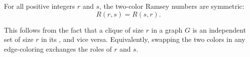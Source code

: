 \begin{proposition} \label{proposition:symmetry_of_two_color_ramsey_numbers_R_r_s_equals_R_s_r}
For all positive integers $r$ and $s$, the two-color Ramsey numbers are symmetric:
$$R(r,s) = R(s,r).$$

This follows from the fact that a clique of size $r$ in a graph $G$ is an independent set of size $r$ in its , and vice versa. Equivalently, swapping the two colors in any edge-coloring exchanges the roles of $r$ and $s$.
\end{proposition}
